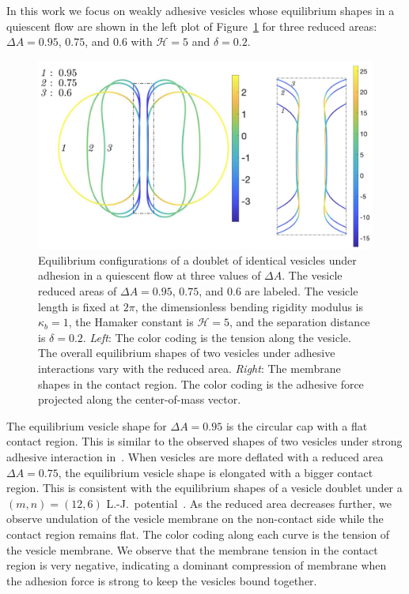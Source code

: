 \documentclass[prf,superscriptaddress,showkeys]{revtex4-1}
\begin{document}
In this work we focus on weakly adhesive vesicles whose equilibrium
shapes in a quiescent flow are shown in the left plot of
Figure~\ref{fig:Dec18_vesicle_shape} for three reduced areas: $\Delta
A=0.95$, $0.75$, and $0.6$ with $\mathcal{H}=5$ and $\delta = 0.2$. 
\begin{figure}
   \includegraphics[keepaspectratio=true,scale=0.45]{figs/Dec18_vesicle_shape_vs_rA_composite.png}
  \caption{\label{fig:Dec18_vesicle_shape} Equilibrium configurations of
  a doublet of identical vesicles under adhesion in a quiescent flow at
  three values of $\Delta A$.  The vesicle reduced areas of $\Delta
  A=0.95$, $0.75$, and $0.6$ are labeled.  The vesicle length is fixed at $2\pi$, the
  dimensionless bending rigidity modulus is $\kappa_b=1$, the Hamaker
  constant is $\mathcal{H}=5$, and the separation distance is
  $\delta=0.2$.  {\em Left}:  The color coding is the
  tension along the vesicle.  The overall equilibrium shapes of two
  vesicles under adhesive interactions vary with the reduced area.  {\em
  Right}: The membrane shapes in the contact region. The color coding is the adhesive force
  projected along the center-of-mass vector.} 
\end{figure}
The equilibrium vesicle shape for $\Delta A=0.95$ is the circular cap
with a flat contact region.  This is similar to the observed shapes of
two vesicles under strong adhesive interaction
in~\cite{RamachandranAndersonLealIsraelachvili2010_Langmuir}.  When
vesicles are more deflated with a reduced area $\Delta A = 0.75$, the
equilibrium vesicle shape is elongated with a bigger contact region.
This is consistent with the equilibrium shapes of a vesicle doublet
under a $(m,n) = (12,6)$
L.-J.~potential~\cite{FlormannAouane2017_SciReports}.  As the reduced
area decreases further, we observe undulation of the vesicle membrane on
the non-contact side while the contact region remains flat.  The color
coding along each curve is the tension of the vesicle membrane.  We
observe that the membrane tension in the contact region is very
negative, indicating a dominant compression of membrane when the
adhesion force is strong to keep the vesicles bound together.
\end{document}
